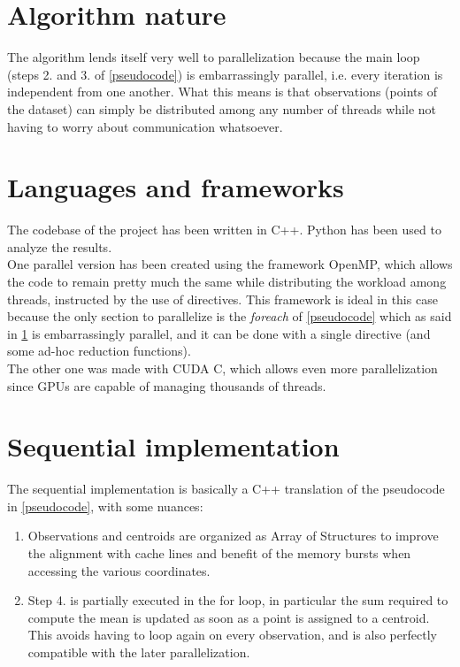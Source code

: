 \documentclass[10pt,twocolumn,letterpaper]{article}
\begin{document}
\section{Algorithm nature} \label{nature}
The algorithm lends itself very well to parallelization because the main loop (steps 2. and 3. of \cref{pseudocode}) is embarrassingly parallel, i.e. every iteration is independent from one another. What this means is that observations (points of the dataset) can simply be distributed among any number of threads while not having to worry about communication whatsoever.

\section{Languages and frameworks}
The codebase of the project has been written in C++. Python has been used to analyze the results.\\
One parallel version has been created using the framework OpenMP, which allows the code to remain pretty much the same while distributing the workload among threads, instructed by the use of directives. This framework is ideal in this case because the only section to parallelize is the \textit{foreach} of \cref{pseudocode} which as said in \cref{nature} is embarrassingly parallel, and it can be done with a single directive (and some ad-hoc reduction functions).\\
The other one was made with CUDA C, which allows even more parallelization since GPUs are capable of managing thousands of threads.

\section{Sequential implementation} \label{seq_imp}
The sequential implementation is basically a C++ translation of the pseudocode in \cref{pseudocode}, with some nuances: 
\begin{enumerate}
	\item Observations and centroids are organized as Array of Structures to improve the alignment with cache lines and benefit of the memory bursts when accessing the various coordinates.
	\item Step 4. is partially executed in the for loop, in particular the sum required to compute the mean is updated as soon as a point is assigned to a centroid. This avoids having to loop again on every observation, and is also perfectly compatible with the later parallelization.
\end{enumerate}
\end{document}

